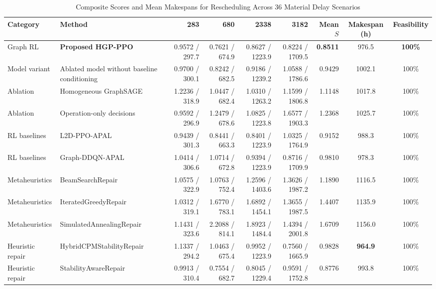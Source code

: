 \documentclass[journal,10pt]{IEEEtran}
\renewcommand{\arraystretch}{0.98}
\begin{document}
\begin{table}[!t]
\centering
\caption{Composite Scores and Mean Makespans for Rescheduling Across 36 Material Delay Scenarios}
\label{tab:resched_master}
\setlength{\tabcolsep}{6pt}
\renewcommand{\arraystretch}{0.98}
\begin{adjustbox}{max width=\textwidth}
\begin{tabular}{@{}llrrrrrcc@{}}
\toprule
\textbf{Category} & \textbf{Method} & \textbf{283} & \textbf{680} & \textbf{2338} & \textbf{3182} & \textbf{Mean $S$} & \textbf{Makespan (h)} & \textbf{Feasibility} \\
\midrule
Graph RL & \textbf{Proposed HGP-PPO} & 0.9572 / 297.7 & 0.7621 / 674.9 & 0.8627 / 1223.9 & 0.8224 / 1709.5 & \textbf{0.8511} & 976.5 & \textbf{100\%} \\
Model variant & Ablated model without baseline conditioning & 0.9700 / 300.1 & 0.8242 / 682.5 & 0.9186 / 1239.2 & 1.0588 / 1786.6 & 0.9429 & 1002.1 & 100\% \\
Ablation & Homogeneous GraphSAGE & 1.2236 / 318.9 & 1.0447 / 682.4 & 1.0310 / 1263.2 & 1.1599 / 1806.8 & 1.1148 & 1017.8 & 100\% \\
Ablation & Operation-only decisions & 0.9592 / 296.9 & 1.2479 / 678.6 & 1.0825 / 1223.8 & 1.6577 / 1903.3 & 1.2368 & 1025.7 & 100\% \\
RL baselines & L2D-PPO-APAL & 0.9439 / 301.3 & 0.8441 / 663.3 & 0.8401 / 1223.9 & 1.0325 / 1764.9 & 0.9152 & 988.3 & 100\% \\
RL baselines & Graph-DDQN-APAL & 1.0414 / 306.6 & 1.0714 / 672.8 & 0.9394 / 1223.9 & 0.8716 / 1709.9 & 0.9810 & 978.3 & 100\% \\
Metaheuristics & BeamSearchRepair & 1.0575 / 322.9 & 1.0763 / 752.4 & 1.2596 / 1403.6 & 1.3626 / 1987.2 & 1.1890 & 1116.5 & 100\% \\
Metaheuristics & IteratedGreedyRepair & 1.0312 / 319.1 & 1.6770 / 783.1 & 1.6892 / 1454.1 & 1.3655 / 1987.5 & 1.4407 & 1135.9 & 100\% \\
Metaheuristics & SimulatedAnnealingRepair & 1.1431 / 323.6 & 2.2088 / 814.1 & 1.8923 / 1484.4 & 1.4394 / 2001.8 & 1.6709 & 1156.0 & 100\% \\
Heuristic repair & HybridCPMStabilityRepair & 1.1337 / 294.2 & 1.0463 / 675.4 & 0.9952 / 1223.9 & 0.7560 / 1665.9 & 0.9828 & \textbf{964.9} & 100\% \\
Heuristic repair & StabilityAwareRepair & 0.9913 / 310.4 & 0.7554 / 682.7 & 0.8045 / 1229.4 & 0.9591 / 1752.8 & 0.8776 & 993.8 & 100\% \\

\end{tabular}
\end{adjustbox}
\end{table}
\end{document}
